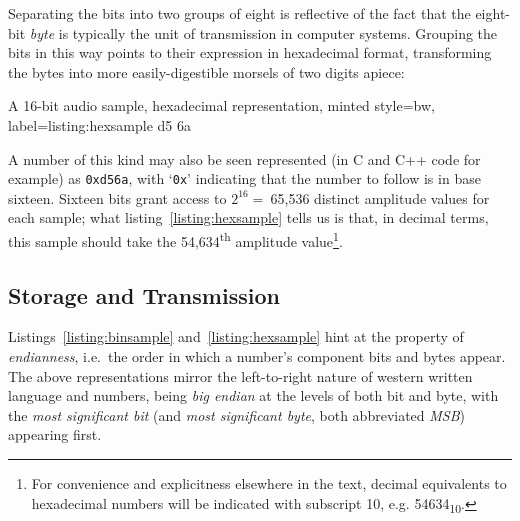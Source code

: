 \noindent
Separating the bits into two groups of eight is reflective of the fact that the
eight-bit \textit{byte} is typically the unit of transmission in computer
systems.
Grouping the bits in this way points to their expression in hexadecimal format,
transforming the bytes into more easily-digestible morsels of two digits apiece:
\begin{codelisting}{
        {A 16-bit audio sample, hexadecimal representation},
    minted style=bw,
    label=listing:hexsample
}
    d5 6a
\end{codelisting}

\noindent
A number of this kind may also be seen represented (in C and C++ code for
example) as \texttt{0xd56a}, with `\texttt{0x}' indicating that the number to
follow is in base sixteen.
Sixteen bits grant access to $2^{16}=~$65,536 distinct amplitude values for each
sample; what listing~\ref{listing:hexsample} tells us is that, in decimal terms,
this sample should take the 54,634\textsuperscript{th} amplitude
value\footnote{
    For convenience and explicitness elsewhere in the text, decimal equivalents
    to hexadecimal numbers will be indicated with subscript 10, e.g.
    54634\textsubscript{10}.
}.

\subsection{Storage and Transmission}\label{subsec:storage-and-transmission}

Listings~\ref{listing:binsample} and~\ref{listing:hexsample} hint at the
property of \textit{endianness}, i.e.\ the order in which a number's component
bits and bytes appear\cite{cohen_holy_1981}.
The above representations mirror the left-to-right nature of western written
language and numbers, being \textit{big endian} at the levels of both bit and
byte, with the \textit{most significant bit} (and \textit{most significant
byte}, both abbreviated \textit{MSB}) appearing first.
